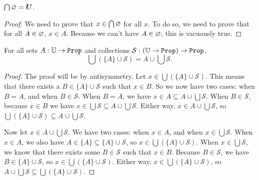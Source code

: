 \documentclass[../math.tex]{subfiles}
\begin{document}
\begin{theorem}
    $\bigcap \varnothing = \bm U$.
\end{theorem}
\begin{proof}
    We need to prove that $x \in \bigcap \varnothing$ for all $x$.  To do so, we need
    to prove that for all $A \in \varnothing$, $x \in A$.  Because we can't have $A
    \in \varnothing$, this is vacuously true.
\end{proof}

\begin{theorem}
    For all sets $A : \U \rightarrow \Prop$ and collections $\mathcal S : (\U
    \rightarrow \Prop) \rightarrow \Prop$,
    \[
        \bigcup (\{A\} \cup \mathcal S) = A \cup \bigcup \mathcal S.
    \]
\end{theorem}
\begin{proof}
    The proof will be by antisymmetry.  Let $x \in \bigcup (\{A\} \cup \mathcal
    S)$.  This means that there exists a $B \in \{A\} \cup \mathcal S$ such that
    $x \in B$.  So we now have two cases: when $B = A$, and when $B \in \mathcal
    S$.  When $B = A$, we have $x \in A \subseteq A \cup \bigcup \mathcal S$.
    When $B \in \mathcal S$, because $x \in B$ we have $x \in \bigcup \mathcal S
    \subseteq A \cup \bigcup \mathcal S$.  Either way, $x \in A \cup \bigcup
    \mathcal S$, so $\bigcup (\{A\} \cup \mathcal S) \subseteq A \cup \bigcup
    \mathcal S$.

    Now let $x \in A \cup \bigcup \mathcal S$.  We have two cases: when $x \in
    A$, and when $x \in \bigcup \mathcal S$.  When $x \in A$, we also have $A
    \in \{A\} \subseteq \{A\} \cup \mathcal S$, so $x \in \bigcup(\{A\} \cup
    \mathcal S)$.  When $x \in \bigcup \mathcal S$, we know that there exists
    some $B \in \mathcal S$ such that $x \in B$.  Because $B \in \mathcal S$, we
    have $B \in \{A\} \cup \mathcal S$, so $x \in \bigcup(\{A\} \cup \mathcal
    S)$.  Either way, $x \in \bigcup(\{A\} \cup \mathcal S)$, so $A \cup \bigcup
    \mathcal S \subseteq \bigcup(\{A\} \cup \mathcal S)$.
\end{proof}
\end{document}
